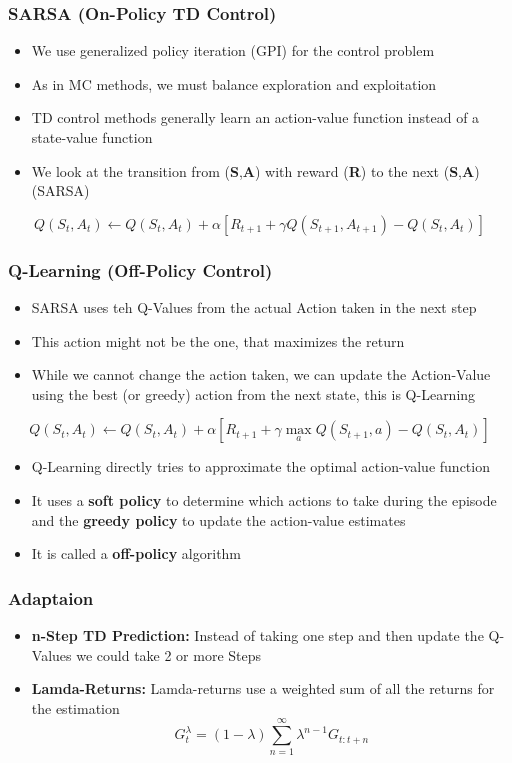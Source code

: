 \subsubsection*{SARSA (On-Policy TD Control)}
\begin{itemize}
    \item We use generalized policy iteration (GPI) for the control problem
    \item As in MC methods, we must balance exploration and exploitation 
    \item TD control methods generally learn an action-value function instead of a state-value function
    \item We look at the transition from (\textbf{S},\textbf{A}) with reward (\textbf{R}) to the next (\textbf{S},\textbf{A})(SARSA)
\end{itemize}
\[
Q(S_t, A_t) \leftarrow Q(S_t, A_t) + \alpha[R_{t+1} + \gamma Q(S_{t+1}, A_{t+1}) - Q(S_t, A_t)]
\]

\subsubsection*{Q-Learning (Off-Policy Control)}
\begin{itemize}
    \item SARSA uses teh Q-Values from the actual Action taken in the next step
    \item This action might not be the one, that maximizes the return
    \item While we cannot change the action taken, we can update the Action-Value using the best (or greedy) action from the next state, this is Q-Learning
\end{itemize}
\[
Q(S_t, A_t) \leftarrow Q(S_t, A_t) + \alpha[R_{t+1} + \gamma \max_a Q(S_{t+1}, a) - Q(S_t, A_t)]
\]
\begin{itemize}
    \item Q-Learning directly tries to approximate the optimal action-value function
    \item It uses a \textbf{soft policy} to determine which actions to take during the episode and the \textbf{greedy policy} to update the action-value estimates
    \item It is called a \textbf{off-policy} algorithm
\end{itemize}
\subsubsection*{Adaptaion}
\begin{itemize}
    \item \textbf{n-Step TD Prediction:} Instead of taking one step and then update the Q-Values we could take 2 or more Steps
    \item \textbf{Lamda-Returns:} Lamda-returns use a weighted sum of all the returns for the estimation
    \[
    G_t^\lambda = (1-\lambda)\sum_{n=1}^{\infty}\lambda^{n-1}G_{t:t+n}
    \]
\end{itemize}
